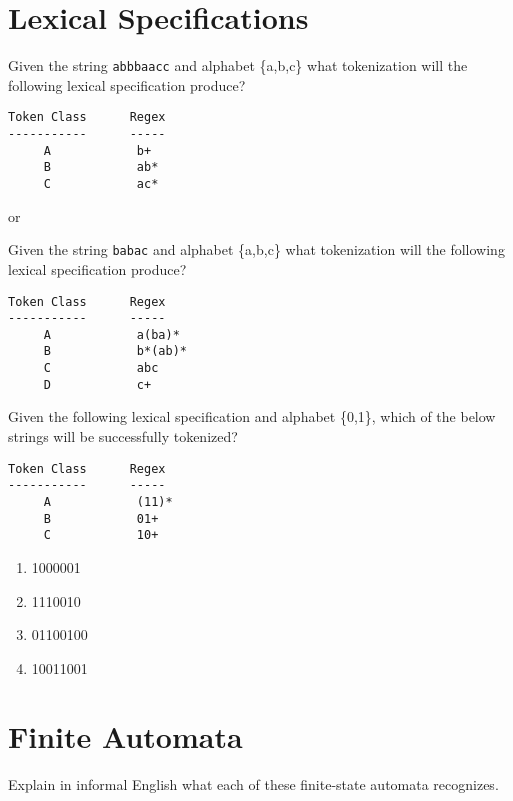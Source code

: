 \documentclass[11pt, oneside]{exam}
\newcommand{\cmark}{\ding{51}}
\begin{document}
\begin{questions}
\section*{Lexical Specifications}

\question[3]
Given the string {\tt abbbaacc} and alphabet \{a,b,c\} what tokenization will the following lexical specification produce?
\begin{verbatim}
Token Class      Regex
-----------      -----
     A            b+
     B            ab*
     C            ac*
\end{verbatim}
{\tt <B, abbb>}
 or {\tt <C, a>}

\question[3]
Given the string {\tt babac} and alphabet \{a,b,c\} what tokenization will the following lexical specification produce?
\begin{verbatim}
Token Class      Regex
-----------      -----
     A            a(ba)*
     B            b*(ab)*
     C            abc
     D            c+
\end{verbatim}
{\tt <B, bab>}

\question[6]
Given the following lexical specification and alphabet \{0,1\}, which of the below strings will be successfully tokenized?
\begin{verbatim}
Token Class      Regex
-----------      -----
     A            (11)*
     B            01+
     C            10+
\end{verbatim}
\begin{enumerate}
\item 1000001 \cmark
\item 1110010 \cmark
\item 01100100 \cmark
\item 10011001 \cmark
\end{enumerate}

\section*{Finite Automata}

\question
Explain in informal English what each of these finite-state automata recognizes.

\end{questions}
\end{document}
